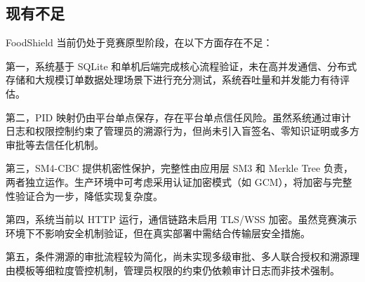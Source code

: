 \subsection{现有不足}

FoodShield 当前仍处于竞赛原型阶段，在以下方面存在不足：

第一，系统基于 SQLite 和单机后端完成核心流程验证，未在高并发通信、分布式存储和大规模订单数据处理场景下进行充分测试，系统吞吐量和并发能力有待评估。

第二，PID 映射仍由平台单点保存，存在平台单点信任风险。虽然系统通过审计日志和权限控制约束了管理员的溯源行为，但尚未引入盲签名、零知识证明或多方审批等去信任化机制。

第三，SM4-CBC 提供机密性保护，完整性由应用层 SM3 和 Merkle Tree 负责，两者独立运作。生产环境中可考虑采用认证加密模式（如 GCM），将加密与完整性验证合为一步，降低实现复杂度。

第四，系统当前以 HTTP 运行，通信链路未启用 TLS/WSS 加密。虽然竞赛演示环境下不影响安全机制验证，但在真实部署中需结合传输层安全措施。

第五，条件溯源的审批流程较为简化，尚未实现多级审批、多人联合授权和溯源理由模板等细粒度管控机制，管理员权限的约束仍依赖审计日志而非技术强制。

